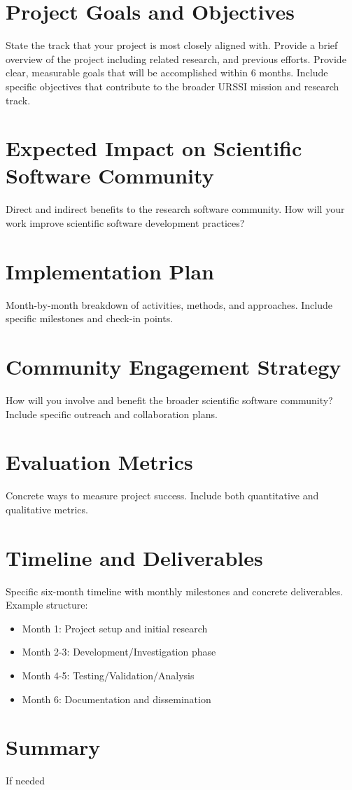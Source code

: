 \documentclass[letterpaper, 11pt]{article}
\begin{document}
\section{Project Goals and Objectives}

State the track that your project is most closely aligned with.
Provide a brief overview of the project including related research, and previous efforts.
Provide clear, measurable goals that will be accomplished within 6 months.
Include specific objectives that contribute to the broader URSSI mission and research track.

\section{Expected Impact on Scientific Software Community}

Direct and indirect benefits to the research software community.
How will your work improve scientific software development practices?

\section{Implementation Plan}

Month-by-month breakdown of activities, methods, and approaches.
Include specific milestones and check-in points.

\section{Community Engagement Strategy}

How will you involve and benefit the broader scientific software community?
Include specific outreach and collaboration plans.

\section{Evaluation Metrics}

Concrete ways to measure project success.
Include both quantitative and qualitative metrics.

\section{Timeline and Deliverables}

Specific six-month timeline with monthly milestones and concrete deliverables.
Example structure:

\begin{itemize}
  \item Month 1: Project setup and initial research
  \item Month 2-3: Development/Investigation phase
  \item Month 4-5: Testing/Validation/Analysis
  \item Month 6: Documentation and dissemination
\end{itemize}

\section{Summary}

If needed

%
\vspace*{-0.25cm}
\begin{footnotesize}
%
%
\end{footnotesize}
\end{document}
